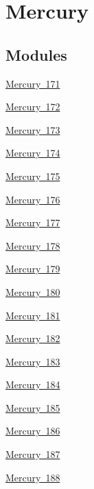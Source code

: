 \hypertarget{group___isotope_const-_mercury}{}\section{Mercury}
\label{group___isotope_const-_mercury}
\subsection*{Modules}
\begin{DoxyCompactItemize}
\item 
\mbox{\hyperlink{group___isotope_const-_mercury-_hg171}{Mercury 171}}
\item 
\mbox{\hyperlink{group___isotope_const-_mercury-_hg172}{Mercury 172}}
\item 
\mbox{\hyperlink{group___isotope_const-_mercury-_hg173}{Mercury 173}}
\item 
\mbox{\hyperlink{group___isotope_const-_mercury-_hg174}{Mercury 174}}
\item 
\mbox{\hyperlink{group___isotope_const-_mercury-_hg175}{Mercury 175}}
\item 
\mbox{\hyperlink{group___isotope_const-_mercury-_hg176}{Mercury 176}}
\item 
\mbox{\hyperlink{group___isotope_const-_mercury-_hg177}{Mercury 177}}
\item 
\mbox{\hyperlink{group___isotope_const-_mercury-_hg178}{Mercury 178}}
\item 
\mbox{\hyperlink{group___isotope_const-_mercury-_hg179}{Mercury 179}}
\item 
\mbox{\hyperlink{group___isotope_const-_mercury-_hg180}{Mercury 180}}
\item 
\mbox{\hyperlink{group___isotope_const-_mercury-_hg181}{Mercury 181}}
\item 
\mbox{\hyperlink{group___isotope_const-_mercury-_hg182}{Mercury 182}}
\item 
\mbox{\hyperlink{group___isotope_const-_mercury-_hg183}{Mercury 183}}
\item 
\mbox{\hyperlink{group___isotope_const-_mercury-_hg184}{Mercury 184}}
\item 
\mbox{\hyperlink{group___isotope_const-_mercury-_hg185}{Mercury 185}}
\item 
\mbox{\hyperlink{group___isotope_const-_mercury-_hg186}{Mercury 186}}
\item 
\mbox{\hyperlink{group___isotope_const-_mercury-_hg187}{Mercury 187}}
\item 
\mbox{\hyperlink{group___isotope_const-_mercury-_hg188}{Mercury 188}}

\end{DoxyCompactItemize}
